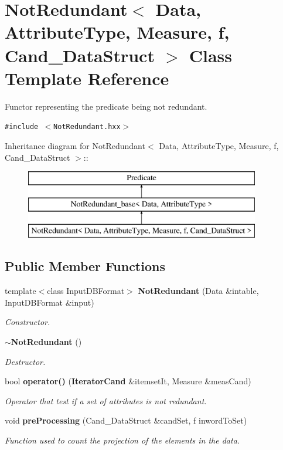 \section{Not\-Redundant$<$ Data, Attribute\-Type, Measure, f, Cand\_\-Data\-Struct $>$ Class Template Reference}
\label{class_not_redundant}
Functor representing the predicate being not redundant.  


{\tt \#include $<$Not\-Redundant.hxx$>$}

Inheritance diagram for Not\-Redundant$<$ Data, Attribute\-Type, Measure, f, Cand\_\-Data\-Struct $>$::\begin{figure}[H]
\begin{center}
\leavevmode
\includegraphics[height=3cm]{class_not_redundant}
\end{center}
\end{figure}
\subsection*{Public Member Functions}
\begin{CompactItemize}
\item 
template$<$class Input\-DBFormat$>$ {\bf Not\-Redundant} (Data \&intable, Input\-DBFormat \&input)\label{class_not_redundant_9c9b80eb14297e25c3fe673143518d48}

\begin{CompactList}\small\item\em Constructor. \item\end{CompactList}\item 
{\bf $\sim$Not\-Redundant} ()\label{class_not_redundant_7c0d90edb6ba88c1f88917ce435c119f}

\begin{CompactList}\small\item\em Destructor. \item\end{CompactList}\item 
bool {\bf operator()} ({\bf Iterator\-Cand} \&itemset\-It, Measure \&meas\-Cand)
\begin{CompactList}\small\item\em Operator that test if a set of attributes is not redundant. \item\end{CompactList}\item 
void {\bf pre\-Processing} (Cand\_\-Data\-Struct \&cand\-Set, f inword\-To\-Set)\label{class_not_redundant_f5217ca7c07b87ac2a051ce4b004734d}

\begin{CompactList}\small\item\em Function used to count the projection of the elements in the data. \item\end{CompactList}\end{CompactItemize}


